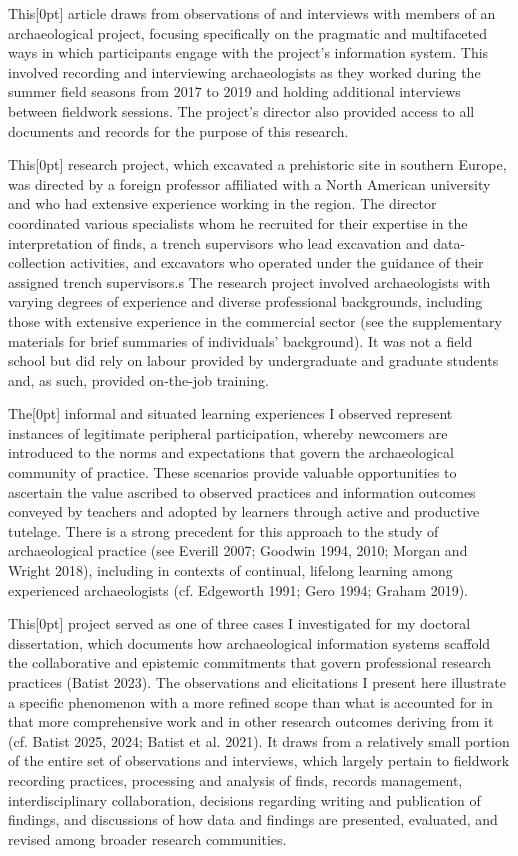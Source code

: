 \documentclass[
]{article}
\newcommand{\paragraphnumber}[1]{\marginnote{\color{lightgray}\tiny{#1}}[0pt]}
\begin{document}
This\paragraphnumber{[9]} article draws from observations of and
interviews with members of an archaeological project, focusing
specifically on the pragmatic and multifaceted ways in which
participants engage with the project's information system. This involved
recording and interviewing archaeologists as they worked during the
summer field seasons from 2017 to 2019 and holding additional interviews
between fieldwork sessions. The project's director also provided access
to all documents and records for the purpose of this research.

This\paragraphnumber{[10]} research project, which excavated a
prehistoric site in southern Europe, was directed by a foreign professor
affiliated with a North American university and who had extensive
experience working in the region. The director coordinated various
specialists whom he recruited for their expertise in the interpretation
of finds, a trench supervisors who lead excavation and data-collection
activities, and excavators who operated under the guidance of their
assigned trench supervisors.s The research project involved
archaeologists with varying degrees of experience and diverse
professional backgrounds, including those with extensive experience in
the commercial sector (see the supplementary materials for brief
summaries of individuals' background). It was not a field school but did
rely on labour provided by undergraduate and graduate students and, as
such, provided on-the-job training.

The\paragraphnumber{[11]} informal and situated learning experiences I
observed represent instances of legitimate peripheral participation,
whereby newcomers are introduced to the norms and expectations that
govern the archaeological community of practice. These scenarios provide
valuable opportunities to ascertain the value ascribed to observed
practices and information outcomes conveyed by teachers and adopted by
learners through active and productive tutelage. There is a strong
precedent for this approach to the study of archaeological practice (see
Everill 2007; Goodwin 1994, 2010; Morgan and Wright 2018), including in
contexts of continual, lifelong learning among experienced
archaeologists (cf. Edgeworth 1991; Gero 1994; Graham 2019).

This\paragraphnumber{[12]} project served as one of three cases I
investigated for my doctoral dissertation, which documents how
archaeological information systems scaffold the collaborative and
epistemic commitments that govern professional research practices
(Batist 2023). The observations and elicitations I present here
illustrate a specific phenomenon with a more refined scope than what is
accounted for in that more comprehensive work and in other research
outcomes deriving from it (cf. Batist 2025, 2024; Batist et al. 2021).
It draws from a relatively small portion of the entire set of
observations and interviews, which largely pertain to fieldwork
recording practices, processing and analysis of finds, records
management, interdisciplinary collaboration, decisions regarding writing
and publication of findings, and discussions of how data and findings
are presented, evaluated, and revised among broader research
communities.
\end{document}
